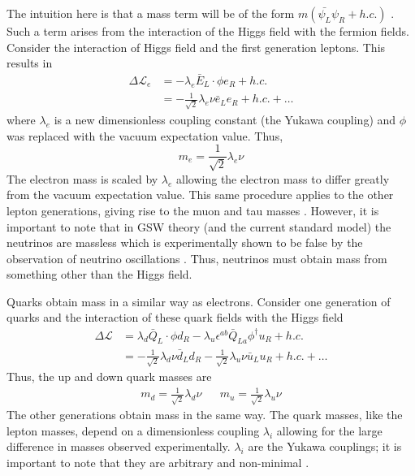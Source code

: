 The intuition here is that a mass term will be of the form $m(\bar{\psi_{L}}\psi_{R}+h.c.)$ \cite{Blundell}. Such a term arises from the interaction of the Higgs field with the fermion fields. Consider the interaction of Higgs field and the first generation leptons. This results in
\begin{align}
    \Delta\mathcal{L}_{e} &= -\lambda_{e}\bar{E}_{L} \cdot \phi e_{R} + h.c. \\
    &= -\frac{1}{\sqrt{2}}\lambda_{e}\nu\bar{e}_{L}e_{R} + h.c. + \dots 
\end{align}
where $\lambda_{e}$ is a new dimensionless coupling constant (the Yukawa coupling) and $\phi$ was replaced with the vacuum expectation value. Thus,
\begin{equation}
    m_{e}=\frac{1}{\sqrt{2}}\lambda_{e}\nu
\end{equation}
The electron mass is scaled by $\lambda_{e}$ allowing the electron mass to differ greatly from the vacuum expectation value. This same procedure applies to the other lepton generations, giving rise to the muon and tau masses \cite{Blundell}. However, it is important to note that in GSW theory (and the current standard model) the neutrinos are massless which is experimentally shown to be false by the observation of neutrino oscillations \cite{NeutrinoOscSupK, NeutrinoOscSNO}. Thus, neutrinos must obtain mass from something other than the Higgs field.

Quarks obtain mass in a similar way as electrons. Consider one generation of quarks and the interaction of these quark fields with the Higgs field
\begin{align}
    \Delta \mathcal{L} &= \lambda_{d}\bar{Q}_{L} \cdot \phi d_{R} - \lambda_{u}\epsilon^{ab}\bar{Q}_{La} \phi^{\dagger} u_{R} + h.c. \\
    &= -\frac{1}{\sqrt{2}}\lambda_{d}\nu \bar{d}_{L}d_{R} - \frac{1}{\sqrt{2}}\lambda_{u}\nu \bar{u}_{L}u_{R} + h.c. + \dots
\end{align}
Thus, the up and down quark masses are
\begin{align}
    m_{d}=\frac{1}{\sqrt{2}}\lambda_{d}\nu &&
    m_{u}=\frac{1}{\sqrt{2}}\lambda_{u}\nu
\end{align}
The other generations obtain mass in the same way. The quark masses, like the lepton masses, depend on a dimensionless coupling $\lambda_{i}$ allowing for the large difference in masses observed experimentally. $\lambda_{i}$ are the Yukawa couplings; it is important to note that they are arbitrary and non-minimal \cite{Peskin}. 


